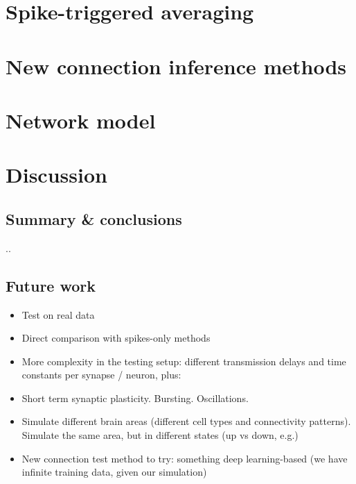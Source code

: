 \documentclass[a4paper, oneside, 11pt]{memoir}
\begin{document}
\chapter{Spike-triggered averaging}
\label{ch:STA}




\chapter{New connection inference methods}
\label{ch4}




\chapter{Network model}
\label{ch5}




\chapter{Discussion}

\section{Summary \& conclusions}

..

\section{Future work}

\begin{itemize}
    \item Test on real data
    \item Direct comparison with spikes-only methods
    \item More complexity in the testing setup: different transmission delays and time constants per synapse / neuron, plus:
    \item Short term synaptic plasticity. Bursting. Oscillations.
    \item Simulate different brain areas (different cell types and connectivity patterns). Simulate the same area, but in different states (up vs down, e.g.)
    \item New connection test method to try: something deep learning-based (we have infinite training data, given our simulation)
\end{itemize}

\References
\end{document}
